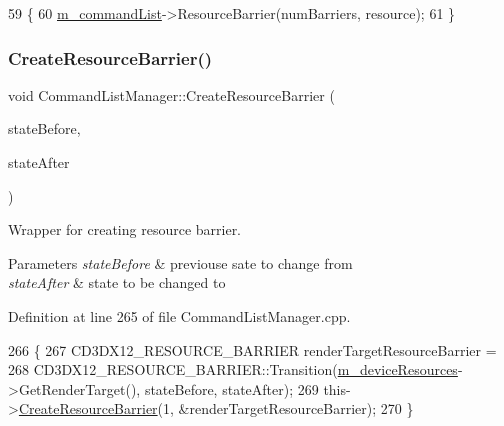 \begin{DoxyCode}
59 \{
60     \mbox{\hyperlink{class_command_list_manager_a1366f0acddca408167ffcab59be71ddb}{m\_commandList}}->ResourceBarrier(numBarriers, resource);
61 \}
\end{DoxyCode}
\mbox{\label{class_command_list_manager_a9c43dd47ed27bb96d59dcfc044f36d07}} 
\subsubsection{\texorpdfstring{Create\+Resource\+Barrier()}{CreateResourceBarrier()}\hspace{0.1cm}{\footnotesize\ttfamily [2/2]}}
{\footnotesize\ttfamily void Command\+List\+Manager\+::\+Create\+Resource\+Barrier (\begin{DoxyParamCaption}\item[{D3\+D12\+\_\+\+R\+E\+S\+O\+U\+R\+C\+E\+\_\+\+S\+T\+A\+T\+ES}]{state\+Before,  }\item[{D3\+D12\+\_\+\+R\+E\+S\+O\+U\+R\+C\+E\+\_\+\+S\+T\+A\+T\+ES}]{state\+After }\end{DoxyParamCaption})}



Wrapper for creating resource barrier. 


\begin{DoxyParams}{Parameters}
{\em state\+Before} & previouse sate to change from \\
\hline
{\em state\+After} & state to be changed to \\
\hline
\end{DoxyParams}


Definition at line 265 of file Command\+List\+Manager.\+cpp.


\begin{DoxyCode}
266 \{
267     CD3DX12\_RESOURCE\_BARRIER renderTargetResourceBarrier =
268         CD3DX12\_RESOURCE\_BARRIER::Transition(\mbox{\hyperlink{class_command_list_manager_a1c48b5dc7b34886ce5057ac194a2385e}{m\_deviceResources}}->GetRenderTarget(), 
      stateBefore, stateAfter);
269     this->\mbox{\hyperlink{class_command_list_manager_a2d7afa441d20a24e50a1891c46cfdd60}{CreateResourceBarrier}}(1, &renderTargetResourceBarrier);
270 \}
\end{DoxyCode}
\mbox{\label{class_command_list_manager_afc1835024199f85fd63f368c13ca724b}} 
